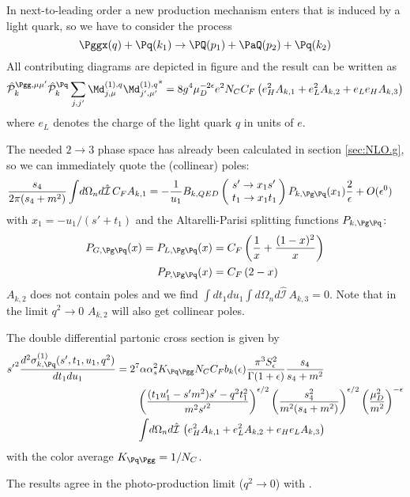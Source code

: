 In next-to-leading order a new production mechanism enters that is induced by a light quark, so we have to consider the process
\begin{equation}
\Pggx(q) + \Pq(k_1) \rightarrow \PQ(p_1)+\PaQ(p_2) + \Pq(k_2)
\end{equation}
All contributing diagrams are depicted in figure  and the result can be written as
\begin{equation}
\hat {\mathcal P}_{k}^{\Pgg,\mu\mu'}\hat {\mathcal P}_{k}^{\Pq}\sum_{j,j'}{\Md^{(1),q}_{j,\mu}\Md^{(1),q}_{j',\mu'}}^* = 8g^4\mu_D^{-2\epsilon}e^2 N_C C_F\left( e_H^2 A_{k,1} +  e_L^2 A_{k,2} +  e_L e_H A_{k,3} \right)
\end{equation}
where $e_L$ denotes the charge of the light quark $q$ in units of $e$.

The needed $2\rightarrow 3$ phase space has already been calculated in section \ref{sec:NLO.g}, so we can immediately quote the (collinear) poles:
\begin{align}
\frac{s_4}{2\pi(s_4+m^2)}\int\!d\Omega_n d\hat{\mathcal I}\,C_F A_{k,1} &=-\frac 1 {u_1}B_{k,QED}\left(\!\begin{array}{l}s'\rightarrow x_1s'\\t_1\rightarrow x_1 t_1\end{array}\!\!\right) P_{k,\Pg\Pq}(x_1)\frac 2 \epsilon + O(\epsilon^0)
\end{align}
with $x_1 = -u_1/(s'+t_1)$ and the Altarelli-Parisi splitting functions $P_{k,\Pg\Pq}$\cite{Altarelli:1977zs,Vogelsang:1995vh}:
\begin{align}
P_{G,\Pg\Pq}(x) = P_{L,\Pg\Pq}(x) &= C_F\left(\frac 1 x + \frac {(1-x)^2} x\right) \label{eq:PGLgq} \\
P_{P,\Pg\Pq}(x) &= C_F\left(2-x\right) \label{eq:PPgq}
\end{align}
$A_{k,2}$ does not contain poles and we find $\int\!dt_1du_1\int\!d\Omega_n d\hat{\mathcal I}\,A_{k,3}=0$. Note that in the limit $q^2\rightarrow 0$ $A_{k,2}$ will also get collinear poles.


The double differential partonic cross section is given by
\begin{align}
{s'}^2\frac{d^2\sigma_{k,\Pq}^{(1)}(s',t_1,u_1,q^2)}{dt_1du_1} &= 2^7\alpha\alpha_s^2 K_{\Pq\Pgg}N_CC_Fb_k(\epsilon)\frac{\pi^3 S_\epsilon^2}{\Gamma(1+\epsilon)} \frac{s_4}{s_4+m^2}  \nonumber\\
 &\hspace{20pt} \left(\frac{(t_1u_1'-s'm^2)s' - q^2t_1^2}{m^2{s'}^2}\right)^{\epsilon/2} \left(\frac{s_4^2}{m^2(s_4+m^2)}\right)^{\epsilon/2} \left(\frac{\mu_D^2}{m^2}\right)^{-\epsilon} \nonumber\\
 &\hspace{20pt} \int\!d\Omega_n d\hat{\mathcal I}\,\left(e_H^2 A_{k,1} + e_L^2 A_{k,2} + e_H e_L A_{k,3} \right)
\end{align}
with the color average $K_{\Pq\Pgg} = 1/N_C$.

The results agree in the photo-production limit ($q^2\rightarrow 0$) with \cite{Bojak:1998zm}.
